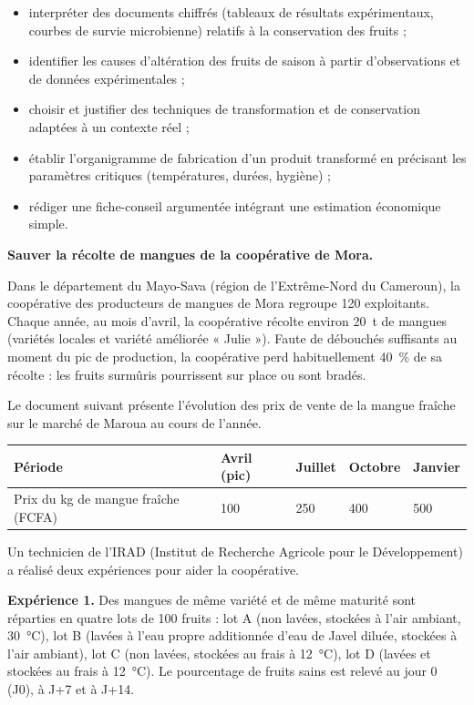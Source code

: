 \documentclass[11pt]{article}
\newcounter{popsec}
\newcounter{popsub}
\newcommand{\courssub}[1]{%
  \stepcounter{popsub}%
  \par\vspace{9pt}\noindent{\popxbold\fontsize{11.5}{13}\selectfont\color{popink}{\color{poporange}\thepopsec.\thepopsub}\hspace{6pt}#1}\par\nopagebreak\vspace{4pt}
}
\begin{document}
\begin{itemize}
\item interpréter des documents chiffrés (tableaux de résultats expérimentaux, courbes de survie microbienne) relatifs à la conservation des fruits ;
\item identifier les causes d'altération des fruits de saison à partir d'observations et de données expérimentales ;
\item choisir et justifier des techniques de transformation et de conservation adaptées à un contexte réel ;
\item établir l'organigramme de fabrication d'un produit transformé en précisant les paramètres critiques (températures, durées, hygiène) ;
\item rédiger une fiche-conseil argumentée intégrant une estimation économique simple.
\end{itemize}

\courssub{Situation}

\textbf{Sauver la récolte de mangues de la coopérative de Mora.}

Dans le département du Mayo-Sava (région de l'Extrême-Nord du Cameroun), la coopérative des producteurs de mangues de Mora regroupe 120 exploitants. Chaque année, au mois d'avril, la coopérative récolte environ \SI{20}{t} de mangues (variétés locales et variété améliorée « Julie »). Faute de débouchés suffisants au moment du pic de production, la coopérative perd habituellement \SI{40}{\%} de sa récolte : les fruits surmûris pourrissent sur place ou sont bradés.

Le document suivant présente l'évolution des prix de vente de la mangue fraîche sur le marché de Maroua au cours de l'année.

\begin{center}
\begin{tabularx}{\linewidth}{|l|X|X|X|X|}
\hline
\rowcolor{popblueL} \textbf{Période} & \textbf{Avril (pic)} & \textbf{Juillet} & \textbf{Octobre} & \textbf{Janvier} \\
\hline
Prix du kg de mangue fraîche (FCFA) & 100 & 250 & 400 & 500 \\
\hline
\end{tabularx}
\end{center}

Un technicien de l'IRAD (Institut de Recherche Agricole pour le Développement) a réalisé deux expériences pour aider la coopérative.

\textbf{Expérience 1.} Des mangues de même variété et de même maturité sont réparties en quatre lots de 100 fruits : lot A (non lavées, stockées à l'air ambiant, \SI{30}{\celsius}), lot B (lavées à l'eau propre additionnée d'eau de Javel diluée, stockées à l'air ambiant), lot C (non lavées, stockées au frais à \SI{12}{\celsius}), lot D (lavées et stockées au frais à \SI{12}{\celsius}). Le pourcentage de fruits sains est relevé au jour 0 (J0), à J+7 et à J+14.
\end{document}
